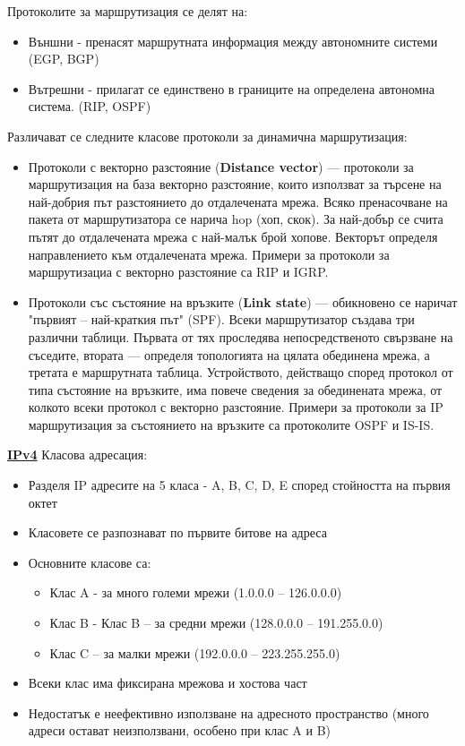 \documentclass{article}
\begin{document}
Протоколите за маршрутизация се делят на:
\begin{itemize}
    \item Външни - пренасят маршрутната информация между автономните системи (EGP, BGP)
    \item Вътрешни - прилагат се единствено в границите на определена автономна система. (RIP, OSPF)
\end{itemize}
Различават се следните класове протоколи за динамична маршрутизация:
\begin{itemize}
    \item Протоколи с векторно разстояние (\textbf{Distance vector}) — протоколи за маршрутизация на база векторно разстояние, които
    използват за търсене на най-добрия път разстоянието до отдалечената мрежа. Всяко пренасочване на пакета от маршрутизатора се
    нарича hop (хоп, скок). За най-добър се счита пътят до отдалечената мрежа с най-малък брой хопове. Векторът определя
    направлението към отдалечената мрежа. Примери за протоколи за маршрутизациа с векторно разстояние са RIP и IGRP.
    \item Протоколи със състояние на връзките (\textbf{Link state}) — обикновено се наричат "първият – най-краткия път" (SPF). Всеки
    маршрутизатор създава три различни таблици. Първата от тях проследява непосредственото свързване на съседите, втората —
    определя топологията на цялата обединена мрежа, а третата е маршрутната таблица. Устройството, действащо според протокол от
    типа състояние на връзките, има повече сведения за обединената мрежа, от колкото всеки протокол с векторно разстояние.
    Примери за протоколи за IP маршрутизация за състоянието на връзките са протоколите OSPF и IS-IS.
\end{itemize}
\textbf{\underline{IPv4}} \newline\newline
Класова адресация:
\begin{itemize}
    \item Разделя IP адресите на 5 класа - A, B, C, D, E според стойността на първия октет
    \item Класовете се разпознават по първите битове на адреса
    \item Основните класове са:
    \begin{itemize}
        \item Клас A - за много големи мрежи (1.0.0.0 – 126.0.0.0)
        \item Клас B - Клас B – за средни мрежи (128.0.0.0 – 191.255.0.0)
        \item Клас C – за малки мрежи (192.0.0.0 – 223.255.255.0)
    \end{itemize}
    \item Всеки клас има фиксирана мрежова и хостова част
    \item Недостатък е неефективно използване на адресното пространство (много адреси остават неизползвани, особено при клас A и B)
\end{itemize}
\end{document}
